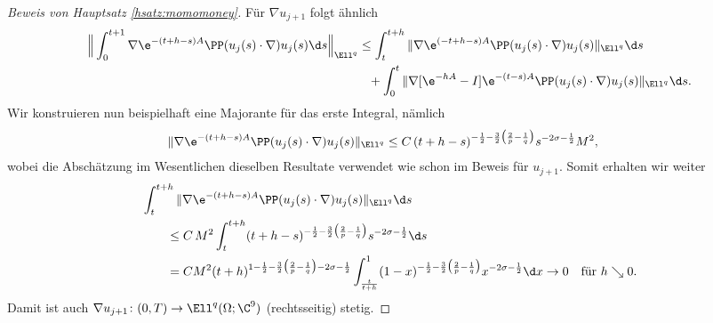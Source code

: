 \begin{proof}[Beweis von Hauptsatz \ref{hsatz:momomoney}]
  Für $\nabla u_{j + 1}$ folgt ähnlich
  \begin{align*}
    \Big\| \int_0^{t + 1} \nabla \e^{-(t + h - s) A} \PP (u_j(s) \cdot \nabla ) u_j(s) \d s \Big\|_{\Ell^q}
    &\leq \int_t^{t + h} \|\nabla \e^{(-t + h - s) A} \PP(u_j(s) \cdot \nabla ) u_j(s) \|_{\Ell^q} \d s \\ 
    &\hphantom{\leq} + \int_0^t \|\nabla [\e^{-h A} - I ] \e^{-(t - s) A} \PP(u_j(s) \cdot \nabla) u_j(s) \|_{\Ell^q} \d s.
  \end{align*}
  Wir konstruieren nun beispielhaft eine Majorante für das erste Integral, nämlich
  \begin{align*}
    \|\nabla \e^{-(t + h - s) A} \PP(u_j(s) \cdot \nabla) u_j(s) \|_{\Ell^q} 
    &\leq C\, (t + h - s)^{-\frac{1}{2} - \frac{3}{2} \big( \frac{2}{p} - \frac{1}{q} \big)} s^{-2 \sigma - \frac{1}{2} } M^2,
  \end{align*}
  wobei die Abschätzung im Wesentlichen dieselben Resultate verwendet wie schon im Beweis für $u_{j + 1}$.
  Somit erhalten wir weiter
  \begin{align*}
    &\int_t^{t + h} \|\nabla \e^{-(t + h - s)A} \PP(u_j(s) \cdot \nabla) u_j(s) \|_{\Ell^q} \d s \\
    &\qquad\leq C\, M^2 \int_t^{t + h} (t + h - s)^{-\frac{1}{2} - \frac{3}{2} \big( \frac{2}{p} - \frac{1}{q} \big)} s^{-2\sigma - \frac{1}{2}} \d s \\
    &\qquad= C M^2 (t + h)^{1 - \frac{1}{2} - \frac{3}{2}\big( \frac{2}{p} - \frac{1}{q} \big) - 2\sigma - \frac{1}{2}} \int_{\frac{t}{t + h}}^1 (1 - x)^{-\frac{1}{2} - \frac{3}{2} \big(\frac{2}{p} - \frac{1}{q}\big)} x^{-2\sigma - \frac{1}{2}} \d x \to 0 \quad\text{für } h \searrow 0.
  \end{align*}
  Damit ist auch $\nabla u_{j + 1} \colon (0, T) \to \Ell^q(\Omega; \C^9)$ (rechtsseitig) stetig.


\end{proof}
